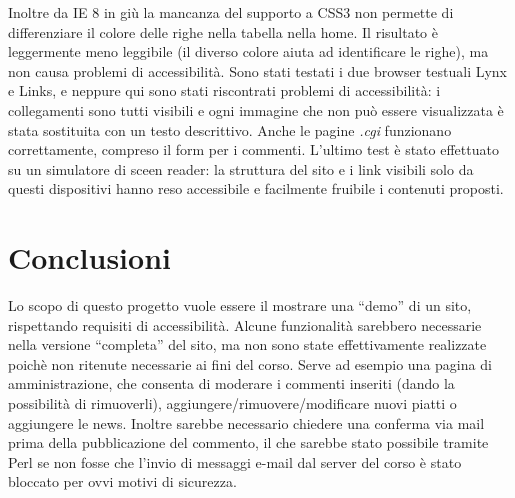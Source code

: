 \documentclass[10pt,a4paper,onecolumn]{article}
\begin{document}
Inoltre da IE 8 in giù la mancanza del supporto a CSS3 non permette di differenziare il colore delle righe nella tabella nella home. Il risultato è leggermente meno leggibile (il diverso colore aiuta ad identificare le righe), ma non causa problemi di accessibilità.
Sono stati testati i due browser testuali Lynx e Links, e neppure qui sono stati riscontrati problemi di accessibilità: i collegamenti sono tutti visibili e ogni immagine che non può essere visualizzata è stata sostituita con un testo descrittivo. Anche le pagine \textit{.cgi} funzionano correttamente, compreso il form per i commenti.
L'ultimo test è stato effettuato su un simulatore di sceen reader: la struttura del sito e i link visibili solo da questi dispositivi hanno reso accessibile e facilmente fruibile i contenuti proposti.

\section{Conclusioni}

Lo scopo di questo progetto vuole essere il mostrare una “demo” di un sito, rispettando requisiti di accessibilità. Alcune funzionalità sarebbero necessarie nella versione “completa” del sito, ma non sono state effettivamente realizzate poichè non ritenute necessarie ai  fini del corso.
Serve ad esempio una pagina di amministrazione, che consenta di moderare i commenti inseriti (dando la possibilità di rimuoverli), aggiungere/rimuovere/modificare nuovi piatti o aggiungere le news. Inoltre sarebbe necessario chiedere una conferma via mail prima della pubblicazione del commento, il che sarebbe stato possibile tramite Perl se non fosse che l’invio di messaggi e-mail dal server del corso è stato bloccato per ovvi motivi di sicurezza.
\end{document}
